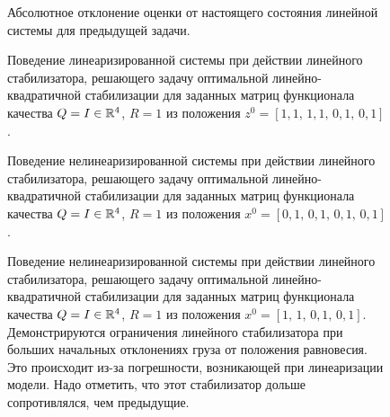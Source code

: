\begin{figure}[t]
	\centering
	
	\caption{Абсолютное отклонение оценки от настоящего состояния линейной системы для предыдущей задачи.}
\end{figure}

\begin{figure}[t]
	\centering
	
	\caption{Поведение линеаризированной системы при действии линейного стабилизатора, решающего задачу оптимальной линейно-квадратичной стабилизации для заданных матриц функционала качества $Q = I \in \mathbb{R}^4$, $R = 1$ из положения $z^0 = [1,\!1,\,1,\!1,\,0,\!1,\,0,\!1]$.}
\end{figure}

\begin{figure}[t]
	\centering
	
	\caption{Поведение нелинеаризированной системы при действии линейного стабилизатора, решающего задачу оптимальной линейно-квадратичной стабилизации для заданных матриц функционала качества $Q = I \in \mathbb{R}^4$, $R = 1$ из положения $x^0 = [0,\!1,\,0,\!1,\,0,\!1,\,0,\!1]$.}
\end{figure}

\begin{figure}[t]
	\centering
	
	\caption{Поведение нелинеаризированной системы при действии линейного стабилизатора, решающего задачу оптимальной линейно-квадратичной стабилизации для заданных матриц функционала качества $Q = I \in \mathbb{R}^4$, $R = 1$ из положения $x^0 = [1,\,1,\,0,\!1,\,0,\!1]$. Демонстрируются ограничения линейного стабилизатора при больших начальных отклонениях груза от положения равновесия. Это происходит из-за погрешности, возникающей при линеаризации модели. Надо отметить, что этот стабилизатор дольше сопротивлялся, чем предыдущие.}
\end{figure}